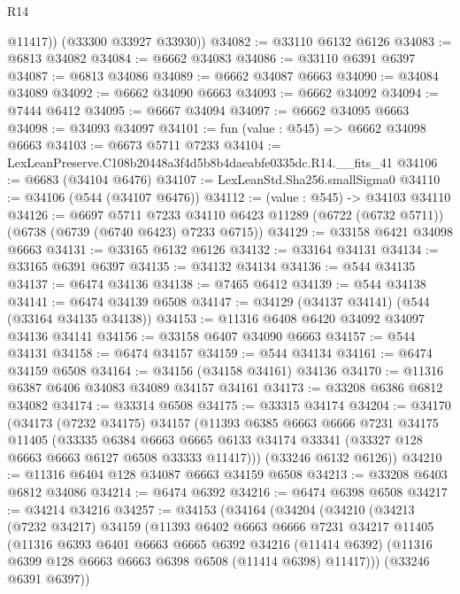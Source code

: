 \begin{lexlean}{R14}
\begin{coremodule}
          @11417))
      (@33300 @33927 @33930))
@34082 := @33110 @6132 @6126
@34083 := @6813 @34082
@34084 := @6662 @34083
@34086 := @33110 @6391 @6397
@34087 := @6813 @34086
@34089 := @6662 @34087 @6663
@34090 := @34084 @34089
@34092 := @6662 @34090 @6663
@34093 := @6662 @34092
@34094 := @7444 @6412
@34095 := @6667 @34094
@34097 := @6662 @34095 @6663
@34098 := @34093 @34097
@34101 := fun (value : @545) => @6662 @34098 @6663
@34103 := @6673 @5711 @7233
@34104 := LexLeanPreserve.C108b20448a3f4d5b8b4daeabfe0335dc.R14.__fits_41
@34106 := @6683 (@34104 @6476)
@34107 := LexLeanStd.Sha256.smallSigma0
@34110 := @34106 (@544 (@34107 @6476))
@34112 := (value : @545) -> @34103 @34110
@34126 := @6697
    @5711
    @7233
    @34110
    @6423
    @11289
    (@6722 (@6732 @5711))
    (@6738 (@6739 (@6740 @6423) @7233 @6715))
@34129 := @33158 @6421 @34098 @6663
@34131 := @33165 @6132 @6126
@34132 := @33164 @34131
@34134 := @33165 @6391 @6397
@34135 := @34132 @34134
@34136 := @544 @34135
@34137 := @6474 @34136
@34138 := @7465 @6412
@34139 := @544 @34138
@34141 := @6474 @34139 @6508
@34147 := @34129 (@34137 @34141) (@544 (@33164 @34135 @34138))
@34153 := @11316 @6408 @6420 @34092 @34097 @34136 @34141
@34156 := @33158 @6407 @34090 @6663
@34157 := @544 @34131
@34158 := @6474 @34157
@34159 := @544 @34134
@34161 := @6474 @34159 @6508
@34164 := @34156 (@34158 @34161) @34136
@34170 := @11316 @6387 @6406 @34083 @34089 @34157 @34161
@34173 := @33208 @6386 @6812 @34082
@34174 := @33314 @6508
@34175 := @33315 @34174
@34204 := @34170
    (@34173
      (@7232 @34175)
      @34157
      (@11393
        @6385
        @6663
        @6666
        @7231
        @34175
        @11405
        (@33335
          @6384
          @6663
          @6665
          @6133
          @34174
          @33341
          (@33327 @128 @6663 @6663 @6127 @6508 @33333 @11417)))
      (@33246 @6132 @6126))
@34210 := @11316 @6404 @128 @34087 @6663 @34159 @6508
@34213 := @33208 @6403 @6812 @34086
@34214 := @6474 @6392
@34216 := @6474 @6398 @6508
@34217 := @34214 @34216
@34257 := @34153
    (@34164
      (@34204
        (@34210
          (@34213
            (@7232 @34217)
            @34159
            (@11393
              @6402
              @6663
              @6666
              @7231
              @34217
              @11405
              (@11316
                @6393
                @6401
                @6663
                @6665
                @6392
                @34216
                (@11414 @6392)
                (@11316 @6399 @128 @6663 @6663 @6398 @6508 (@11414 @6398) @11417)))
            (@33246 @6391 @6397))

\end{coremodule}
\end{lexlean}
